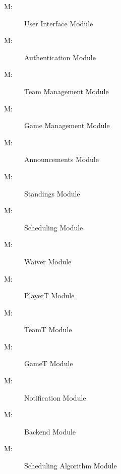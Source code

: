 \documentclass[12pt, titlepage]{article}
\newcounter{mnum}
\newcommand{\mthemnum}{M\themnum}
\begin{document}
\begin{description}
\item [ \mthemnum \label{mUI}:] User Interface Module
\item [ \mthemnum \label{mAuth}:] Authentication Module
\item [ \mthemnum \label{mTeamManagement}:] Team Management Module
\item [ \mthemnum \label{mGameManagement}:] Game Management Module
\item [ \mthemnum \label{mAnnouncements}:] Announcements Module
\item [ \mthemnum \label{mStandings}:] Standings Module
\item [ \mthemnum \label{mScheduling}:] Scheduling Module
\item [ \mthemnum \label{mWaiver}:] Waiver Module
\item [ \mthemnum \label{mPlayerT}:] PlayerT Module
\item [ \mthemnum \label{mTeamT}:] TeamT Module
\item [ \mthemnum \label{mGameT}:] GameT Module
\item [ \mthemnum \label{mNotification}:] Notification Module
\item [ \mthemnum \label{mBackend}:] Backend Module
\item [ \mthemnum \label{mAlgo}:] Scheduling Algorithm Module


\end{description}
\end{document}

